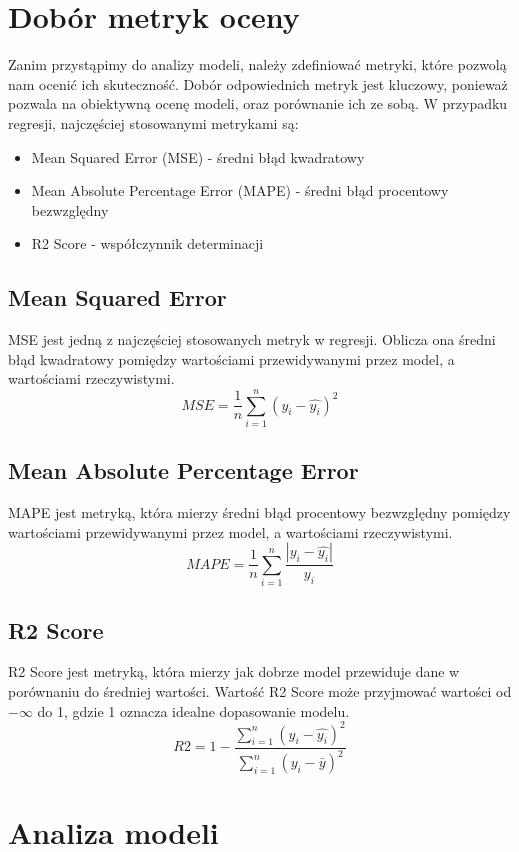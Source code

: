 \documentclass[11pt]{article}
\begin{document}
\section{Dobór metryk oceny}
Zanim przystąpimy do analizy modeli, należy zdefiniować metryki, które pozwolą nam ocenić ich skuteczność.
Dobór odpowiednich metryk jest kluczowy, ponieważ pozwala na obiektywną ocenę modeli, oraz porównanie ich ze sobą.
W przypadku regresji, najczęściej stosowanymi metrykami są:
\begin{itemize}
\item Mean Squared Error (MSE) - średni błąd kwadratowy
\item Mean Absolute Percentage Error (MAPE) - średni błąd procentowy bezwzględny
\item R2 Score - współczynnik determinacji
\end{itemize}
\subsection*{Mean Squared Error}
MSE jest jedną z najczęściej stosowanych metryk w regresji. Oblicza ona średni błąd kwadratowy pomiędzy wartościami przewidywanymi przez model, a wartościami rzeczywistymi.
\begin{equation}
MSE = \frac{1}{n} \sum_{i=1}^{n} (y_i - \hat{y_i})^2
\end{equation}
\subsection*{Mean Absolute Percentage Error}
MAPE jest metryką, która mierzy średni błąd procentowy bezwzględny pomiędzy wartościami przewidywanymi przez model, a wartościami rzeczywistymi.
\begin{equation}
MAPE = \frac{1}{n} \sum_{i=1}^{n} \frac{|y_i - \hat{y_i}|}{y_i}
\end{equation}
\subsection*{R2 Score}
R2 Score jest metryką, która mierzy jak dobrze model przewiduje dane w porównaniu do średniej wartości. Wartość R2 Score może przyjmować wartości od $-\infty$
  do 1, gdzie 1 oznacza idealne dopasowanie modelu.
\begin{equation}
R2 = 1 - \frac{\sum_{i=1}^{n} (y_i - \hat{y_i})^2}{\sum_{i=1}^{n} (y_i - \bar{y})^2}
\end{equation}
\section{Analiza modeli}
\end{document}
